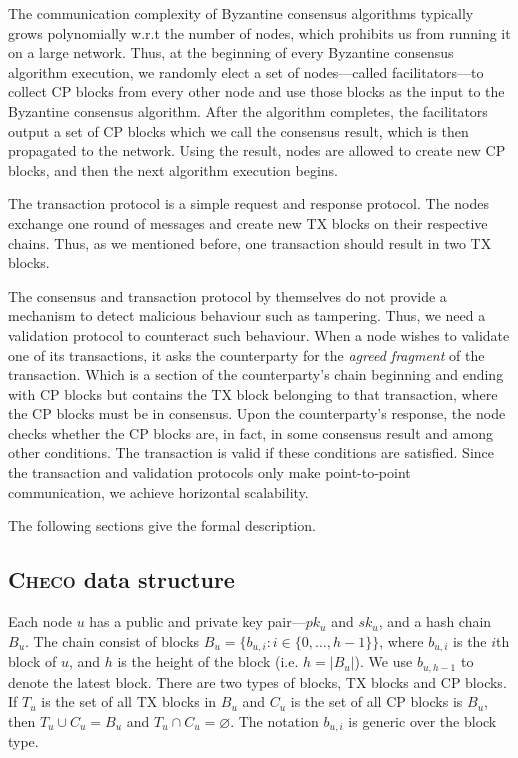 The communication complexity of Byzantine consensus algorithms typically grows polynomially w.r.t the number of nodes,
which prohibits us from running it on a large network.
Thus, at the beginning of every Byzantine consensus algorithm execution,
we randomly elect a set of nodes---called facilitators---to collect CP blocks from every other node and use those blocks as the input to the Byzantine consensus algorithm.
After the algorithm completes,
the facilitators output a set of CP blocks which we call the consensus result,
which is then propagated to the network.
Using the result, nodes are allowed to create new CP blocks,
and then the next algorithm execution begins.

The transaction protocol is a simple request and response protocol.
The nodes exchange one round of messages and create new TX blocks on their respective chains.
Thus, as we mentioned before, one transaction should result in two TX blocks.

The consensus and transaction protocol by themselves do not provide a mechanism to detect malicious behaviour such as tampering.
Thus, we need a validation protocol to counteract such behaviour.
When a node wishes to validate one of its transactions, it asks the counterparty for the \emph{agreed fragment} of the transaction.
Which is a section of the counterparty's chain beginning and ending with CP blocks but contains the TX block belonging to that transaction,
where the CP blocks must be in consensus.
Upon the counterparty's response,
the node checks whether the CP blocks are, in fact, in some consensus result and among other conditions.
The transaction is valid if these conditions are satisfied.
Since the transaction and validation protocols only make point-to-point communication,
we achieve horizontal scalability.

The following sections give the formal description.

\subsection{\textsc{Checo} data structure}
Each node $u$ has a public and private key pair---$pk_u$ and $sk_u$, and a hash chain $B_u$.
The chain consist of blocks $B_u = \{ b_{u, i} : i \in \{ 0, \dots, h - 1 \} \}$,
where $b_{u, i}$ is the $i$th block of $u$,
and $h$ is the height of the block (i.e. $h = |B_u|$).
We use $b_{u, h-1}$ to denote the latest block.
There are two types of blocks, TX blocks and CP blocks.
If $T_u$ is the set of all TX blocks in $B_u$ and $C_u$ is the set of all CP blocks is $B_u$,
then $T_u \cup C_u = B_u$ and $T_u \cap C_u = \varnothing$.
The notation $b_{u, i}$ is generic over the block type.

